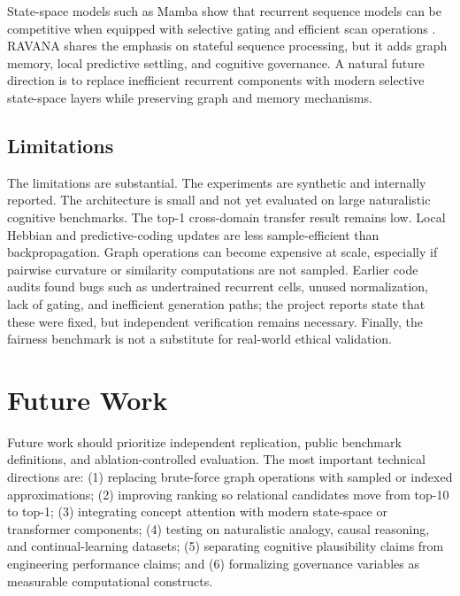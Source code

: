 \documentclass[11pt]{article}
\begin{document}
State-space models such as Mamba show that recurrent sequence models can be competitive when equipped with selective gating and efficient scan operations \cite{gu2023}. RAVANA shares the emphasis on stateful sequence processing, but it adds graph memory, local predictive settling, and cognitive governance. A natural future direction is to replace inefficient recurrent components with modern selective state-space layers while preserving graph and memory mechanisms.

\subsection{Limitations}
The limitations are substantial. The experiments are synthetic and internally reported. The architecture is small and not yet evaluated on large naturalistic cognitive benchmarks. The top-1 cross-domain transfer result remains low. Local Hebbian and predictive-coding updates are less sample-efficient than backpropagation. Graph operations can become expensive at scale, especially if pairwise curvature or similarity computations are not sampled. Earlier code audits found bugs such as undertrained recurrent cells, unused normalization, lack of gating, and inefficient generation paths; the project reports state that these were fixed, but independent verification remains necessary. Finally, the fairness benchmark is not a substitute for real-world ethical validation.

\section{Future Work}
Future work should prioritize independent replication, public benchmark definitions, and ablation-controlled evaluation. The most important technical directions are: (1) replacing brute-force graph operations with sampled or indexed approximations; (2) improving ranking so relational candidates move from top-10 to top-1; (3) integrating concept attention with modern state-space or transformer components; (4) testing on naturalistic analogy, causal reasoning, and continual-learning datasets; (5) separating cognitive plausibility claims from engineering performance claims; and (6) formalizing governance variables as measurable computational constructs.
\end{document}
